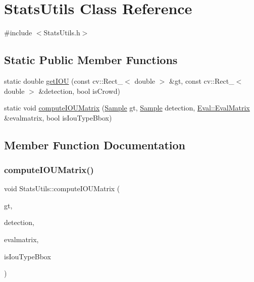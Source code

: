 \hypertarget{class_stats_utils}{}\section{Stats\+Utils Class Reference}
\label{class_stats_utils}


{\ttfamily \#include $<$Stats\+Utils.\+h$>$}

\subsection*{Static Public Member Functions}
\begin{DoxyCompactItemize}
\item 
static double \hyperlink{class_stats_utils_a88224307181b4b86d5e611e34e77587e}{get\+I\+OU} (const cv\+::\+Rect\+\_\+$<$ double $>$ \&gt, const cv\+::\+Rect\+\_\+$<$ double $>$ \&detection, bool is\+Crowd)
\item 
static void \hyperlink{class_stats_utils_ab2ddaf474a74534ae5896d7d564d9a68}{compute\+I\+O\+U\+Matrix} (\hyperlink{struct_sample}{Sample} gt, \hyperlink{struct_sample}{Sample} detection, \hyperlink{namespace_eval_a565709ccceb6f242086a1bab22551525}{Eval\+::\+Eval\+Matrix} \&evalmatrix, bool is\+Iou\+Type\+Bbox)
\end{DoxyCompactItemize}


\subsection{Member Function Documentation}
\mbox{\label{class_stats_utils_ab2ddaf474a74534ae5896d7d564d9a68}} 
\subsubsection{\texorpdfstring{compute\+I\+O\+U\+Matrix()}{computeIOUMatrix()}}
{\footnotesize\ttfamily void Stats\+Utils\+::compute\+I\+O\+U\+Matrix (\begin{DoxyParamCaption}\item[{\hyperlink{struct_sample}{Sample}}]{gt,  }\item[{\hyperlink{struct_sample}{Sample}}]{detection,  }\item[{\hyperlink{namespace_eval_a565709ccceb6f242086a1bab22551525}{Eval\+::\+Eval\+Matrix} \&}]{evalmatrix,  }\item[{bool}]{is\+Iou\+Type\+Bbox }\end{DoxyParamCaption})\hspace{0.3cm}{\ttfamily [static]}}

